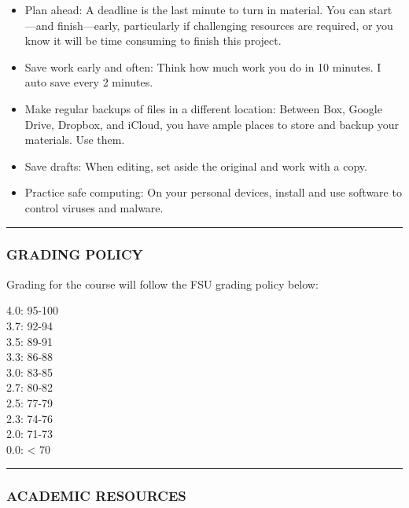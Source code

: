 \documentclass[]{tufte-handout}
\begin{document}
\begin{itemize}
\item
  Plan ahead: A deadline is the last minute to turn in material. You can
  start---and finish---early, particularly if challenging resources are
  required, or you know it will be time consuming to finish this
  project.
\item
  Save work early and often: Think how much work you do in 10 minutes. I
  auto save every 2 minutes.
\item
  Make regular backups of files in a different location: Between Box,
  Google Drive, Dropbox, and iCloud, you have ample places to store and
  backup your materials. Use them.
\item
  Save drafts: When editing, set aside the original and work with a
  copy.
\item
  Practice safe computing: On your personal devices, install and use
  software to control viruses and malware.
\end{itemize}

\begin{center}\rule{0.5\linewidth}{0.5pt}\end{center}

\hypertarget{grading-policy}{%
\subsubsection{GRADING POLICY}\label{grading-policy}}

Grading for the course will follow the FSU grading policy below:

4.0: 95-100\\
3.7: 92-94\\
3.5: 89-91\\
3.3: 86-88\\
3.0: 83-85\\
2.7: 80-82\\
2.5: 77-79\\
2.3: 74-76\\
2.0: 71-73\\
0.0: \textless{} 70

\begin{center}\rule{0.5\linewidth}{0.5pt}\end{center}

\hypertarget{academic-resources}{%
\subsubsection{ACADEMIC RESOURCES}\label{academic-resources}}
\end{document}
